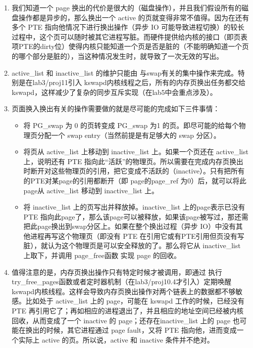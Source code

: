 \begin{enumerate}
\def\labelenumi{\arabic{enumi}.}
\item
  我们知道一个 page
  换出的代价是很大的（磁盘操作），并且我们假设所有的磁盘操作都是异步的，那么换出一个
  active 的页就变得非常不值得。因为在还有多个 PTE
  指向他情况下进行换出操作（异步 IO
  可能导致进程切换）的较长过程中，这个页可以随时被其它进程写脏。而硬件提供给内核的接口（即页表项PTE的dirty位）使得内核只能知道一个页是否是脏的（不能明确知道一个页的哪个部分是脏的），当这种情况发生时，就导致了一次无效的写出。
\item
  active\_list 和 inactive\_list 的维护只能由
  与swap有关的集中操作来完成。特别是在lab3/proj11引入
  kswapd内核线程之后，所有的内存页换出任务都交给kswapd，这样减少了复杂的同步互斥实现（在lab5中会重点涉及）。
\item
  页面换入换出有关的操作需要做的就是尽可能的完成如下三件事情：

  \begin{itemize}
  \tightlist
  \item
    将 PG\_swap 为 0 的页转变成 PG\_swap 为1
    的页。即尽可能的给每个物理页分配一个 swap
    entry（当然前提是有足够大的 swap 分区）。
  \item
    将页从 active\_list 上移动到 inactive\_list 上。如果一个页还在
    active\_list 上，说明还有 PTE
    指向此``活跃''的物理页。所以需要在完成内存页换出时断开对这些物理页的引用，把它变成不活跃的（inactive）。只有把所有的PTE对某page的引用都断开（即
    page的page\_ref 为0）后，就可以将此page从 active\_list 移动到
    inactive\_list 上。
  \item
    将 inactive\_list 上的页写出并释放掉。inactive\_list
    上的page表示已没有 PTE
    指向此page了，那么该page可以被释放，如果该page被写过，那还需把此page换出到swap分区上。如果在整个换出过程（异步
    IO）中没有其他进程再写这个物理页（即没有 PTE
    在引用它或有PTE引用但页没有写脏），就认为这个物理页是可以安全释放的了。那么将它从
    inactive\_list 上取下，并调用 page\_free函数 实现 page 的回收。
  \end{itemize}
\item
  值得注意的是，内存页换出操作只有特定时候才被调用，即通过
  执行try\_free\_pages函数或者定时器机制（在lab3/proj10.4才引入）定期唤醒kswapd内核线程。这样会导致内存页换出操作对两个链表上的数据都不够敏感。比如处于
  active\_list 上的 page，可能在 kswapd 工作的时候，已经没有 PTE
  再引用它了；再如相应的进程退出了，并且相应的地址空间已经被内核回收，从而变成了一个
  inactive 的 page；还存在inactive\_list 上的 page
  也可能在换出的时候，其它进程通过 page fault，又将 PTE
  指向他，进而变成一个实际上 active 的页。所以说，active 和 inactive
  条件并不绝对。
\end{enumerate}

